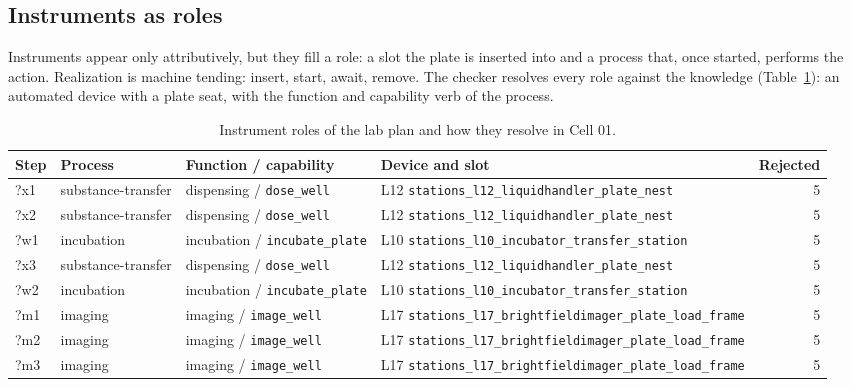 \documentclass[10pt,a4paper]{article}
\begin{document}
\subsection{Instruments as roles}\label{sec:instruments}

Instruments appear only attributively, but they fill a role: a slot the plate is inserted into and a process that, once started, performs the action. Realization is machine tending: insert, start, await, remove. The checker resolves every role against the knowledge (Table~\ref{tab:instruments}): an automated device with a plate seat, with the function and capability verb of the process.

\begin{table}[tbp]\centering\footnotesize
\caption{Instrument roles of the lab plan and how they resolve in Cell 01.}\label{tab:instruments}
\begin{tabularx}{\linewidth}{llp{3.2cm}Xr}\toprule
\textbf{Step} & \textbf{Process} & \textbf{Function / capability} & \textbf{Device and slot} & \textbf{Rejected} \\\midrule
?x1 & substance-transfer & dispensing / \texttt{dose\_\allowbreak{}well} & L12 \texttt{stations\_\allowbreak{}l12\_\allowbreak{}liquidhandler\_\allowbreak{}plate\_\allowbreak{}nest} & 5 \\
?x2 & substance-transfer & dispensing / \texttt{dose\_\allowbreak{}well} & L12 \texttt{stations\_\allowbreak{}l12\_\allowbreak{}liquidhandler\_\allowbreak{}plate\_\allowbreak{}nest} & 5 \\
?w1 & incubation & incubation / \texttt{incubate\_\allowbreak{}plate} & L10 \texttt{stations\_\allowbreak{}l10\_\allowbreak{}incubator\_\allowbreak{}transfer\_\allowbreak{}station} & 5 \\
?x3 & substance-transfer & dispensing / \texttt{dose\_\allowbreak{}well} & L12 \texttt{stations\_\allowbreak{}l12\_\allowbreak{}liquidhandler\_\allowbreak{}plate\_\allowbreak{}nest} & 5 \\
?w2 & incubation & incubation / \texttt{incubate\_\allowbreak{}plate} & L10 \texttt{stations\_\allowbreak{}l10\_\allowbreak{}incubator\_\allowbreak{}transfer\_\allowbreak{}station} & 5 \\
?m1 & imaging & imaging / \texttt{image\_\allowbreak{}well} & L17 \texttt{stations\_\allowbreak{}l17\_\allowbreak{}brightfieldimager\_\allowbreak{}plate\_\allowbreak{}load\_\allowbreak{}frame} & 5 \\
?m2 & imaging & imaging / \texttt{image\_\allowbreak{}well} & L17 \texttt{stations\_\allowbreak{}l17\_\allowbreak{}brightfieldimager\_\allowbreak{}plate\_\allowbreak{}load\_\allowbreak{}frame} & 5 \\
?m3 & imaging & imaging / \texttt{image\_\allowbreak{}well} & L17 \texttt{stations\_\allowbreak{}l17\_\allowbreak{}brightfieldimager\_\allowbreak{}plate\_\allowbreak{}load\_\allowbreak{}frame} & 5 \\\bottomrule
\end{tabularx}
\end{table}
\end{document}
